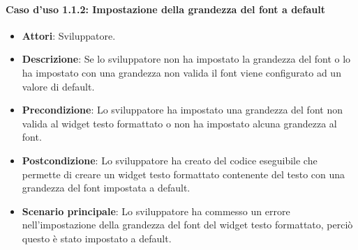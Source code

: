 \paragraph{Caso d'uso 1.1.2: Impostazione della grandezza del font a default}
\begin{itemize}
\item\textbf{Attori}: Sviluppatore.
\item\textbf{Descrizione}: Se lo sviluppatore non ha impostato la grandezza del font o lo ha impostato con una grandezza non valida il font viene configurato ad un valore di default.
\item\textbf{Precondizione}: Lo sviluppatore ha impostato una grandezza del font non valida al widget testo formattato o non ha impostato alcuna grandezza al font.
\item\textbf{Postcondizione}: Lo sviluppatore ha creato del codice eseguibile che permette di creare un widget testo formattato contenente del testo con una grandezza del font impostata a default.
\item\textbf{Scenario principale}: Lo sviluppatore ha commesso un errore nell'impostazione della grandezza del font del widget testo formattato, perciò questo è stato impostato a default.
\end{itemize}